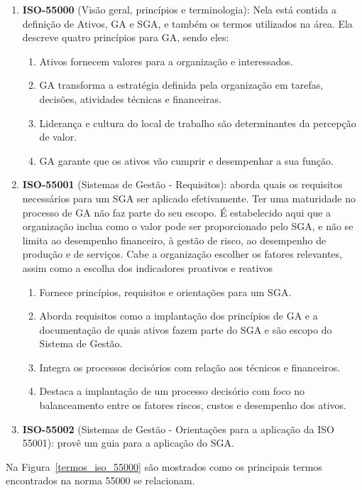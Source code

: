 \begin{enumerate}
	\item \textbf{ISO-55000} (Visão geral, princípios e terminologia): Nela está contida a definição de Ativos, GA e SGA, e também os termos utilizados na área. Ela descreve quatro princípios para GA, sendo eles:
		\begin{enumerate}
			\item Ativos fornecem valores para a organização e interessados.
			\item GA transforma a estratégia definida pela organização em tarefas, decisões, atividades técnicas e financeiras.
			\item Liderança e cultura do local de trabalho são determinantes da percepção de valor.
			\item GA garante que os ativos vão cumprir e desempenhar a sua função.
		\end{enumerate}
	\item \textbf{ISO-55001} (Sistemas de Gestão - Requisitos): aborda quais os requisitos necessários para um SGA ser aplicado efetivamente. Ter uma maturidade no processo de GA não faz parte do seu escopo. É estabelecido aqui que a organização inclua como o valor pode ser proporcionado pelo SGA, e não se limita ao desempenho financeiro, à gestão de risco, ao desempenho de produção e de serviços. Cabe a organização escolher os fatores relevantes, assim como a escolha dos indicadores proativos e reativos
		\begin{enumerate}
			\item Fornece princípios, requisitos e orientações para um SGA.
			\item Aborda requisitos como a implantação dos princípios de GA e a documentação de quais ativos fazem parte do SGA e são escopo do Sistema de Gestão.
			\item Integra os processos decisórios com relação aos técnicos e financeiros.
			\item Destaca a implantação de um processo decisório com foco no balanceamento entre os fatores riscos, custos e desempenho dos ativos.
		\end{enumerate}
	\item \textbf{ISO-55002} (Sistemas de Gestão - Orientações para a aplicação da ISO 55001): provê um guia para a aplicação do SGA. 
\end{enumerate}

Na Figura~\ref{termos_iso_55000} são mostrados como os principais termos encontrados na norma 55000 se relacionam.

